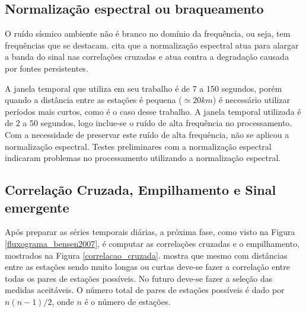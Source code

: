 \subsection{Normalização espectral ou braqueamento}

O ruído sísmico ambiente não é branco no domínio da frequência, ou seja, tem frequências que se destacam. \cite{bensen_processing_2007} cita que a normalização espectral atua para alargar a banda do sinal nas correlações cruzadas e atua contra a degradação causada por fontes persistentes.

A janela temporal que \cite{bensen_processing_2007} utiliza em seu trabalho é de 7 a 150 segundos, porém quando a distância entre as estações é pequena ($\simeq 20 km$) é necessário utilizar períodos mais curtos, como é o caso desse trabalho. A janela temporal utilizada é de 2 a 50 segundos, logo inclue-se o ruído de alta frequência no processamento. Com a necessidade de preservar este ruído de alta frequência, não se aplicou a normalização espectral. Testes preliminares com a normalização espectral indicaram problemas no processamento utilizando a normalização espectral. 


\subsection{Correlação Cruzada, Empilhamento e  Sinal emergente}

Após preparar as séries temporais diárias, a próxima fase, como visto na Figura \ref{fluxograma_bensen2007}, é computar as correlações cruzadas e o empilhamento, mostrados na Figura \ref{correlacao_cruzada}. \cite{bensen_processing_2007} mostra que mesmo com distâncias entre as estações sendo muito longas ou curtas deve-se fazer a correlação entre todas os pares de estações possíveis. No futuro deve-se fazer a seleção das medidas aceitáveis. O número total de pares de estações possíveis é dado por $n(n-1)/2$, onde $n$ é o número de estações.

